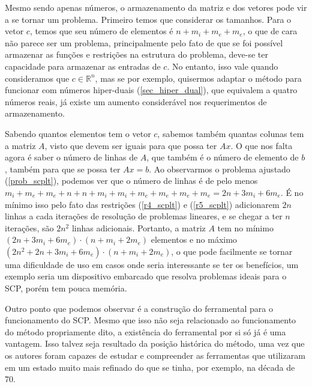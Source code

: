 Mesmo sendo apenas números, o armazenamento da matriz e dos vetores pode vir a
se tornar um problema. Primeiro temos que considerar os tamanhos. Para o vetor
\(c\), temos que seu número de elementos é \(n+m_i+m_e+m_e\), o que de cara
não parece ser um problema, principalmente pelo fato de que se foi possível
armazenar as funções e restrições na estrutura do problema, deve-se ter
capacidade para armazenar as entradas de \(c\). No entanto, isso vale
quando consideramos que \(c \in \mathbb{R}^n\), mas se por exemplo, quisermos
adaptar o método para funcionar com números hiper-duais (\ref{sec_hiper_dual}),
que equivalem a quatro números reais, já existe um aumento considerável nos
requerimentos de armazenamento.

Sabendo quantos elementos tem o vetor \(c\), sabemos também quantas colunas tem
a matriz \(A\), visto que devem ser iguais para que possa ter \(Ax\). O que nos
falta agora é saber o número de linhas de \(A\), que também é o número de elemento
de \(b\), também para que se possa ter \(Ax = b\). Ao observarmos o problema
ajustado (\ref{prob_scplt}), podemos ver que o número de linhas é de pelo menos
\( m_i + m_e + m_e + n + n + m_i + m_i + m_e + m_e + m_e + m_e = 2n + 3m_i + 6m_e\).
É no mínimo isso pelo fato das restrições (\ref{r4_scplt}) e (\ref{r5_scplt})
adicionarem \(2n\) linhas a cada iterações de resolução de problemas lineares,
e se chegar a ter \(n\) iterações, são \(2n^2\) linhas adicionais.
Portanto, a matriz \(A\) tem no mínimo \( (2n + 3m_i+6m_e) \cdot  (n+m_i+2m_e) \)
elementos e no máximo  \( (2n^2 + 2n + 3m_i+6m_e) \cdot (n+m_i+2m_e)\), o que
pode facilmente se tornar uma dificuldade de uso em casos onde seria interessante
se ter os benefícios, um exemplo seria um dispositivo embarcado que resolva problemas
ideais para o SCP, porém tem pouca memória.

Outro ponto que podemos observar é a construção do ferramental para o funcionamento
do SCP. Mesmo que isso não seja relacionado ao funcionamento do método propriamente
dito, a existência do ferramental por si só já é uma vantagem. Isso talvez seja resultado
da posição histórica do método, uma vez que os autores foram capazes de estudar e
compreender as ferramentas que utilizaram em um estado muito mais refinado do que
se tinha, por exemplo, na década de 70.

